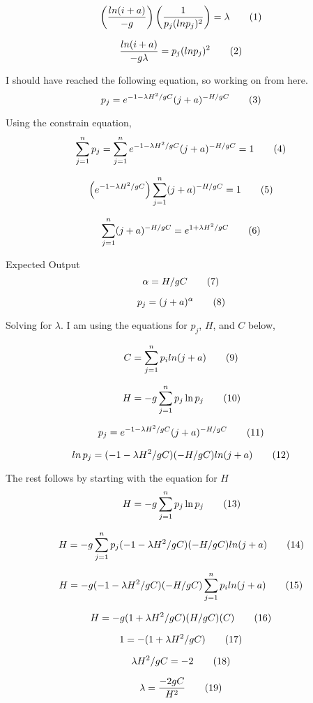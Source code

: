 \[
  \left(
    \frac{ln(i + a)}{-g}
  \right)
  \left(
    \frac{
      1
    }{
      p_j(ln p_j)^2
    }
  \right)
  =
  \lambda
  \addtag
\]

\[
  \frac{ln(i + a)}{-g \lambda}
  =
  p_j(ln p_j)^2
  \addtag
\]

I should have reached the following equation, so working on from here.
\[
  p_j
  =
  e^{
    -1 - 
    \lambda H^2 / gC
  }
  (j + a)^{
    -H / gC
  }
  \addtag
\]

Using the constrain equation,
\[
  \sum_{j=1}^{n}
    p_j
  =
  \sum_{j=1}^{n}
    e^{
      -1 - 
      \lambda H^2 / gC
    }
    (j + a)^{
      -H / gC
    }
  =
  1
  \addtag
\]

\[
  \left(
    e^{
      -1 - 
      \lambda H^2 / gC
    }
  \right)
  \sum_{j=1}^{n}
  (j + a)^{
    -H / gC
  }
  =
  1
  \addtag
\]

\[
  \sum_{j=1}^{n}
  (j + a)^{
    -H / gC
  }
  =
  e^{
    1 + 
    \lambda H^2 / gC
  }
  \addtag
\]

Expected Output
\[
  \alpha = H / gC
  \addtag
\]

\[
  p_j = (j + a)^\alpha
  \addtag
\]

Solving for $\lambda$. I am using the equations for $p_j$, $H$, and $C$ below,

\[
  C
  =
  \sum_{j=1}^{n}
    p_i
    ln(j + a)
  \addtag
\]

\[
  H
  =
  -g
  \sum_{j=1}^{n}
    p_j \ln p_j
  \addtag
\]

\[
  p_j
  =
  e^{
    -1 - 
    \lambda H^2 / gC
  }
  (j + a)^{
    -H / gC
  }
  \addtag
\]

\[
  ln \, p_j
  =
  ( 
    -1 - 
    \lambda H^2 / gC
  )
  (
    -H / gC
  ) 
  ln
  (j + a)
  \addtag
\]

The rest follows by starting with the equation for $H$
\[
  H
  =
  -g
  \sum_{j=1}^{n}
    p_j \ln p_j
  \addtag
\]

\[
  H
  =
  -g
  \sum_{j=1}^{n}
    p_j 
  ( 
    -1 - 
    \lambda H^2 / gC
  )
  (
    -H / gC
  ) 
  ln
  (j + a)
  \addtag
\]

\[
  H
  =
  -g
  ( 
    -1 - 
    \lambda H^2 / gC
  )
  (
    -H / gC
  )
  \sum_{j=1}^{n}
    p_i 
  ln(j + a)
  \addtag
\]

\[
  H
  =
  -g
  ( 
    1 + 
    \lambda H^2 / gC
  )
  (
    H / gC
  )
  (C)
  \addtag
\]

\[
  1
  =
  -(1 + 
  \lambda H^2 / gC
  )
  \addtag
\]

\[
  \lambda H^2 / gC
  =
  -2
  \addtag
\]

\[
  \lambda 
  =
  \frac{
    -2gC
  }{
    H^2
  }
  \addtag
\]